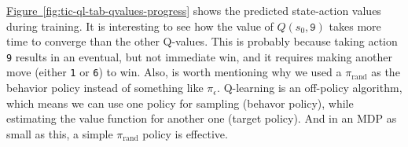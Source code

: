 \documentclass{article}
\begin{document}
\begin{figure}[!h]
    \centering
     \hspace{0.1in}
     \hspace{0.1in}
     \hspace{0.1in}
     \hspace{0.1in}
    \caption{}
    \label{fig:tic-ql-qvalues}
\end{figure}

\hyperref[fig:tic-ql-tab-qvalues-progress] {Figure~\ref*{fig:tic-ql-tab-qvalues-progress}} shows the
predicted state-action values during training. It is interesting to see how the value of $Q(s_0,
\texttt{9})$ takes more time to converge than the other Q-values. This is probably because taking
action \texttt{9} results in an eventual, but not immediate win, and it requires making another move
(either \texttt{1} or \texttt{6}) to win. Also, is worth mentioning why we used a
$\pi_{\textrm{rand}}$ as the behavior policy instead of something like $\pi_{\epsilon}$. Q-learning
is an off-policy algorithm, which means we can use one policy for sampling (behavor policy), while
estimating the value function for another one (target policy). And in an MDP as small as this, a
simple $\pi_{\textrm{rand}}$ policy is effective.
\end{document}
